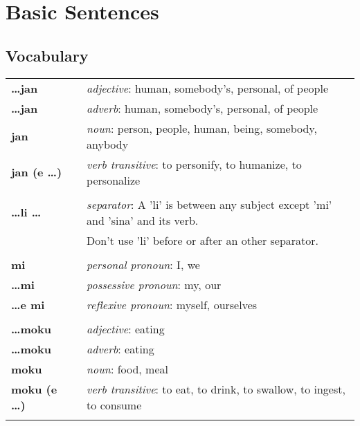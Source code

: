 \section{Basic Sentences}
\subsection*{Vocabulary}
%
\begin{supertabular}{p{2,5cm}|ll}
%
%
\textbf{\dots jan} && \textit{adjective}: human, somebody's, personal, of people \\ %
\textbf{\dots jan} && \textit{adverb}: human, somebody's, personal, of people \\ %
\textbf{jan} && \textit{noun}: person, people, human, being, somebody, anybody \\ %
\textbf{jan (e \dots)} && \textit{verb transitive}: to personify, to humanize, to personalize \\ %
 && \\ %
%
\textbf{\dots li \dots} && \textit{separator}: A 'li' is between any subject except 'mi' and 'sina' and its verb. \\ && Don't use 'li' before or after an other separator. \\ %
 && \\ %
%
\textbf{mi} && \textit{personal pronoun}: I, we  \\ 
\textbf{\dots mi} && \textit{possessive pronoun}: my, our \\  
\textbf{\dots e mi} && \textit{reflexive pronoun}: myself, ourselves  \\ 
 && \\ %
%
\textbf{\dots moku} && \textit{adjective}: eating \\ %
\textbf{\dots moku} && \textit{adverb}: eating \\ %
\textbf{moku} && \textit{noun}: food, meal \\ %
\textbf{moku (e \dots)} && \textit{verb transitive}: to eat, to drink, to swallow, to ingest, to consume \\ %
 && \\ %

\end{supertabular}
